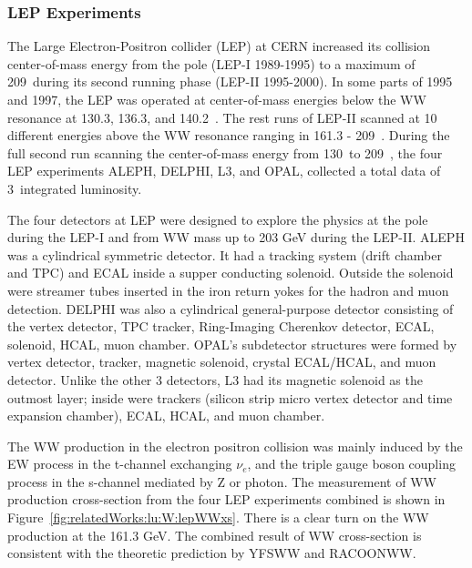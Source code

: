 \subsubsection{LEP Experiments}
The Large Electron-Positron collider (LEP) at CERN increased its collision center-of-mass energy from the \PZ pole (LEP-I 1989-1995) to a maximum of 209~\GeV during its second running phase (LEP-II 1995-2000). In some parts of 1995 and 1997, the LEP was operated at center-of-mass energies below the WW resonance at 130.3, 136.3, and 140.2~\GeV. The rest runs of LEP-II scanned at 10 different energies above the WW resonance ranging in 161.3 - 209~\GeV. During the full second run scanning the center-of-mass energy from 130~\GeV to 209~\GeV, the four LEP experiments ALEPH, DELPHI, L3, and OPAL, collected a total data of 3~\fbinv integrated luminosity. 

The four detectors at LEP were designed to explore the physics at the \PZ pole during the LEP-I and from WW mass up to 203 GeV during the LEP-II. ALEPH was a cylindrical symmetric detector. It had a tracking system  (drift chamber and TPC) and ECAL inside a supper conducting solenoid. Outside the solenoid were streamer tubes inserted in the iron return yokes for the hadron and muon detection. DELPHI was also a cylindrical general-purpose detector consisting of the vertex detector, TPC tracker, Ring-Imaging Cherenkov detector, ECAL, solenoid, HCAL, muon chamber. OPAL's subdetector structures were formed by vertex detector, tracker, magnetic solenoid, crystal ECAL/HCAL, and muon detector. Unlike the other 3 detectors, L3 had its magnetic solenoid as the outmost layer; inside were trackers (silicon strip micro vertex detector and time expansion chamber), ECAL, HCAL, and muon chamber. 

The WW production in the electron positron collision was mainly induced by the EW process in the t-channel exchanging $\nu_e$, and the triple gauge boson coupling process in the s-channel mediated by Z or photon. The measurement of WW production cross-section from the four LEP experiments combined is shown in Figure~\ref{fig:relatedWorks:lu:W:lepWWxs}. There is a clear turn on the WW production at the 161.3 GeV. The combined result of WW cross-section is consistent with the theoretic prediction by YFSWW and RACOONWW.

